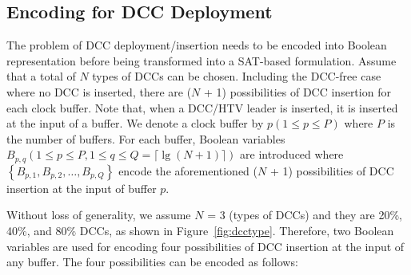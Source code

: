 \subsection{Encoding for DCC Deployment}
\label{subsec:eddcd}
The problem of DCC deployment/insertion needs to be encoded into Boolean representation before being transformed into a SAT-based formulation. Assume that a total of $N$ types of DCCs can be chosen. Including the DCC-free case where no DCC is inserted, there are ($N$ + 1) possibilities of DCC insertion for each clock buffer. Note that, when a DCC/HTV leader is inserted, it is inserted at the input of a buffer. We denote a clock buffer by $p\left(1 \leq p \leq P\right)$ where $P$ is the number of buffers. For each buffer, Boolean variables $B_{p,q}\left(1 \leq p \leq P, 1 \leq q \leq Q = \lceil \lg (N + 1)\rceil \right)$ are introduced where $\left\{B_{p,1}, B_{p,2},\dotsc, B_{p,Q}\right\}$ encode the aforementioned ($N$ + 1) possibilities of DCC insertion at the input of buffer $p$.

\begin{comment}
Without loss of generality, we assume $N$ = 3, and $M$ = 1. Thus, there are 3 types of DCCs, which are assumed to be 20\%, 40\%, and 80\% DCCs, as shown in Figure~\ref{fig:dcctype}. In addition, there is 1 type of technology leader, which is assumed to be a HTV leader. Therefore, three Boolean variables are used for encoding eight possibilities of DCC and technology leader insertion at the input of any buffer. The eight possibilities can be encoded as follows:\newline
\end{comment}

Without loss of generality, we assume $N$ = 3 (types of DCCs) and they are 20\%, 40\%, and 80\% DCCs, as shown in Figure~\ref{fig:dcctype}. Therefore, two Boolean variables are used for encoding four possibilities of DCC insertion at the input of any buffer. The four possibilities can be encoded as follows:
\begin{comment}
\begin{tabular}{ | l | c | c | }
	\hline
  	Leader type & DCC type & $\{B_{p,3}, B_{p,2}, B_{p,1}\}$ \\ \hline
  	(1)\quad Nominal V\textsubscript{th} & None & \{0, 0, 0\} \\ \hline
  	(2)\quad Nominal V\textsubscript{th} &20\% &  \{0, 0, 1\} \\ \hline
  	(3)\quad Nominal V\textsubscript{th} &40\% &  \{0, 1, 0\} \\ \hline
  	(4)\quad Nominal V\textsubscript{th} &80\% &  \{0, 1, 1\} \\ \hline
	(5)\quad HTV & None & \{1, 0, 0\} \\ \hline
  	(6)\quad HTV & 20\% &  \{1, 0, 1\} \\ \hline
  	(7)\quad HTV & 40\% &  \{1, 1, 0\} \\ \hline
  	(8)\quad HTV & 80\% &  \{1, 1, 1\} \\ \hline 
\end{tabular}
\newline
\end{comment}

